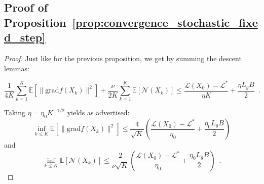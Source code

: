 \documentclass[twoside,11pt]{article}
\newcommand{\grad}{{\mathrm{grad}}}
\begin{document}
\subsection{Proof of Proposition~\ref{prop:convergence_stochastic_fixed_step}}
\begin{proof}
    Just like for the previous proposition, we get by summing the descent lemmas:

    $$\frac{1}{4K}\sum_{k=1}^K\mathbb{E}[\|\grad f(X_k)\|^2] + \frac{\nu}{2K} \sum_{k=1}^K\mathbb{E}[\mathcal{N}(X_k)]\leq \frac{\mathcal{L}(X_0) - \mathcal{L}^*}{\eta K} + \frac{\eta L_gB}2\enspace .$$

Taking $\eta = \eta_0K^{-1/2}$ yields as advertised:
$$
\inf_{k\leq K}\mathbb{E}[\|\grad f(X_k)\|^2] \leq \frac{4}{\sqrt{K}}\left( \frac{\mathcal{L}(X_0) - \mathcal{L}^*}{\eta_0} + \frac{\eta_0 L_gB}2\right)
$$
and 
$$
\inf_{k\leq K}\mathbb{E}[\mathcal{N}(X_k)] \leq \frac{2}{\nu \sqrt{K}}\left( \frac{\mathcal{L}(X_0) - \mathcal{L}^*}{\eta_0} + \frac{\eta_0 L_gB}2\right)\enspace.
$$
\end{proof}
\end{document}
